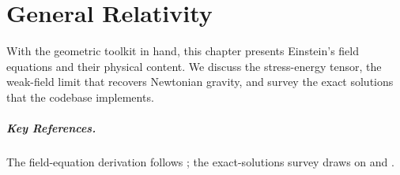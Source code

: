 \chapter{General Relativity}
\label{ch:general-relativity}

With the geometric toolkit in hand, this chapter presents Einstein's field
equations and their physical content. We discuss the stress-energy tensor, the
weak-field limit that recovers Newtonian gravity, and survey the exact
solutions that the codebase implements.









\paragraph{Key References.}
The field-equation derivation follows \cite{Carroll2004}; the exact-solutions
survey draws on \cite{Wald1984} and \cite{Hartle2003}.
